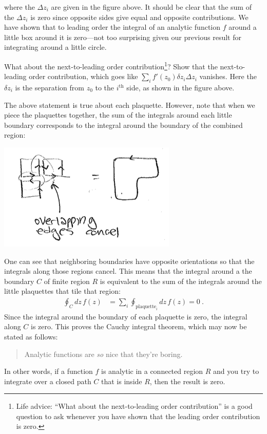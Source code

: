 where the $\Delta z_i$ are given in the figure above. It should be clear that the sum of the $\Delta z_i$ is zero since opposite sides give equal and opposite contributions. We have shown that to leading order the integral of an analytic function $f$ around a little box around it is zero---not too surprising given our previous result for integrating around a little circle. 
\begin{exercise}
What about the next-to-leading order contribution\footnote{Life advice: ``What about the next-to-leading order contribution'' is a good question to ask whenever you have shown that the leading order contribution is zero.}? Show that the next-to-leading order contribution, which goes like $\sum_i f'(z_0)\delta z_i \Delta z_i$ vanishes. Here the $\delta z_i$ is the separation from $z_0$ to the $i^\text{th}$ side, as shown in the figure above. 
\end{exercise}
The above statement is true about each plaquette. However, note that when we piece the plaquettes together, the sum of the integrals around each little boundary corresponds to the integral around the boundary of the combined region:
\begin{center}
\includegraphics[width=.4\textwidth]{figures/Lec_2017_plaqses.png}
\end{center}
One can see that neighboring boundaries have opposite orientations so that the integrals along those regions cancel. 
%
This means that the integral around a the boundary $C$ of finite region $R$ is equivalent to the sum of the integrals around the little plaquettes that tile that region:
\begin{align}
	\oint_C dz\, f(z) &= \sum_i \oint_{\text{plaquette}_i} dz\, f(z) = 0 \ .
\end{align}
Since the integral around the boundary of each plaquette is zero, the integral along $C$ is zero. This proves the Cauchy integral theorem, which may now be stated as follows:
\begin{quote}
Analytic functions are \emph{so} nice that they're boring.
\end{quote}
In other words, if a function $f$ is analytic in a connected region $R$ and you try to integrate over a closed path $C$ that is inside $R$, then the result is zero. 

